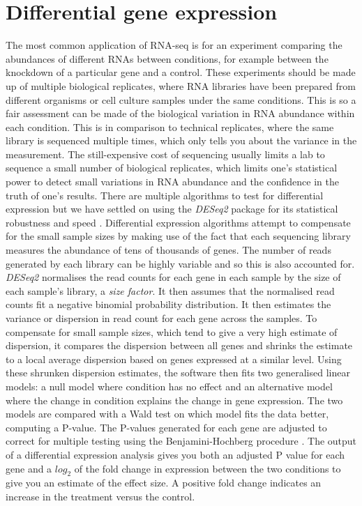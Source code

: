\section{Differential gene expression}
The most common application of RNA-seq is for an experiment comparing the abundances of different RNAs between conditions, for example between the knockdown of a particular gene and a control. These experiments should be made up of multiple biological replicates, where RNA libraries have been prepared from different organisms or cell culture samples under the same conditions. This is so a fair assessment can be made of the biological variation in RNA abundance within each condition. This is in comparison to technical replicates, where the same library is sequenced multiple times, which only tells you about the variance in the measurement. The still-expensive cost of sequencing usually limits a lab to sequence a small number of biological replicates, which limits one's statistical power to detect small variations in RNA abundance and the confidence in the truth of one's results. There are multiple algorithms to test for differential expression but we have settled on using the \textit{DESeq2} package for its statistical robustness and speed \citep{Love2014}.
Differential expression algorithms attempt to compensate for the small sample sizes by making use of the fact that each sequencing library measures the abundance of tens of thousands of genes. The number of reads generated by each library can be highly variable and so this is also accounted for. \textit{DESeq2} normalises the read counts for each gene in each sample by the size of each sample's library, a \textit{size factor}. It then assumes that the normalised read counts fit a negative binomial probability distribution. It then estimates the variance or dispersion in read count for each gene across the samples. To compensate for small sample sizes, which tend to give a very high estimate of dispersion, it compares the dispersion between all genes and shrinks the estimate to a local average dispersion based on genes expressed at a similar level. Using these shrunken dispersion estimates, the software then fits two generalised linear models: a null model where condition has no effect and an alternative model where the change in condition explains the change in gene expression. The two models are compared with a Wald test on which model fits the data better, computing a P-value. The P-values generated for each gene are adjusted to correct for multiple testing using the Benjamini-Hochberg procedure \citep{Benjamini1995}. The output of a differential expression analysis gives you both an adjusted P value for each gene and a $log_2$ of the fold change in expression between the two conditions to give you an estimate of the effect size. A positive fold change indicates an increase in the treatment versus the control. 

